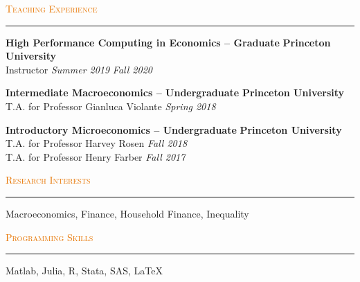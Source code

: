 \documentclass{resume} %
\renewenvironment{rSection}[1]{
\sectionskip
\textcolor[HTML]{e77500}{\textsc{#1}}
\sectionlineskip
\hrule
\begin{list}{}{
\setlength{\leftmargin}{1.5em}
}
\item[]
}{
\end{list}
}
\begin{document}

\begin{rSection}{Teaching Experience}

{\bf High Performance Computing in Economics -- Graduate} \hfill {\bf Princeton University} \\
{Instructor} \hfill {\em Summer 2019}
{} \hfill {\em Fall 2020}

{\bf Intermediate Macroeconomics -- Undergraduate} \hfill {\bf Princeton University} \\
{T.A. for Professor Gianluca Violante} \hfill {\em Spring 2018} 

{\bf Introductory Microeconomics -- Undergraduate} \hfill {\bf Princeton University} \\
{T.A. for Professor Harvey Rosen} \hfill {\em Fall 2018} \\
{T.A. for Professor Henry Farber} \hfill {\em Fall 2017} 

\end{rSection}


\begin{rSection}{Research Interests}

Macroeconomics, Finance, Household Finance, Inequality

\end{rSection}



\begin{rSection}{Programming Skills}

Matlab, Julia, R, Stata, SAS, \LaTeX

\end{rSection}
\end{document}
